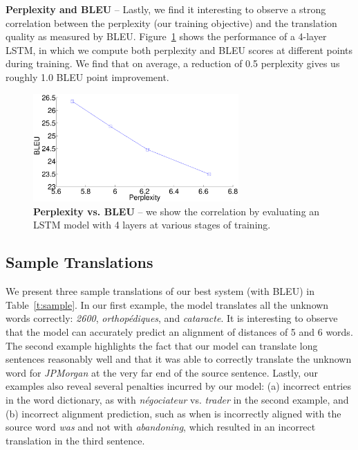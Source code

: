 {\bf Perplexity and BLEU} -- Lastly, we find it interesting to observe a strong correlation 
between the perplexity (our training objective) and the translation quality as measured by BLEU. 
Figure~\ref{f:cor} shows the performance of a 4-layer LSTM, in which we compute both perplexity and 
BLEU scores at different points during training. We find that on average, a reduction of 0.5 perplexity 
gives us roughly 1.0 BLEU point improvement.
\begin{figure}[tbh!]
\centering
\includegraphics[width=0.7\textwidth, clip=true, trim= 0 0 0 0]{img/3-cor} %
\caption[Perplexity vs. BLEU]{{\bf Perplexity vs. BLEU} -- we show the correlation by evaluating an LSTM model with 4 layers at various stages of training. 
} 
\label{f:cor}
\end{figure}


\subsection{Sample Translations}
We present three sample translations of our best system
(with \bestbleuunk{} BLEU) in Table~\ref{t:sample}. In our  first example,
the model translates all the
unknown words correctly: {\it 2600}, {\it orthop{\'e}diques}, and {\it
cataracte}. It is interesting to observe that the model can accurately predict
an alignment of distances of 5 and 6 words. The second
example highlights the fact that our model can translate long
sentences reasonably well and that it was able to
correctly translate the unknown word for {\it JPMorgan} at the very far end of
the source sentence. Lastly, our examples also reveal several
penalties incurred by our model: (a) incorrect entries in the word dictionary, as with {\it n\'{e}gociateur} vs. {\it trader} in the second example, 
and (b) incorrect alignment prediction, such as when 
  is incorrectly aligned
with the source word {\it was} and not with {\it abandoning}, which resulted in an
incorrect translation in the third sentence.

